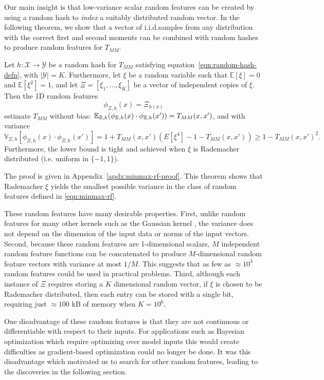Our main insight is that low-variance scalar random features can be created
by using a random hash to \emph{index} a suitably distributed random vector.
In the following theorem, we show that a vector of i.i.d.\@ samples
from any distribution with the correct first and second moments
can be combined with random hashes to produce random features for $T_{MM}$.
\begin{theorem}\label{thm:general-minmax-rf}
    Let $h:\mathcal X \to \mathcal Y$ be a random hash for $T_{MM}$ satisfying equation~\ref{eqn:random-hash-defn}, with $|\mathcal Y|=K$. Furthermore, let $\xi$ be a random variable such that $\mathbb{E}[\xi]=0$ and $\mathbb{E}[\xi^2]=1$,
    and let $\Xi=[\xi_1,\ldots,\xi_K]$ be a vector of independent copies of $\xi$.
    Then the 1D random features 
    \begin{equation}\label{eqn:minmax-rf}
        \phi_{\Xi,h}(x)=\Xi_{h(x)}  
    \end{equation}
    estimate $T_{MM}$ without bias: 
    $\mathbb{E}_{\Xi,h}(\phi_{\Xi,h}(x)\cdot\phi_{\Xi,h}(x')) = T_{MM}(x,x')$,
    and with variance
    \begin{equation}\label{eqn:general-minmax-rf-variance}
    \mathbb{V}_{\Xi,h}\left[\phi_{\Xi,h}(x)\cdot \phi_{\Xi,h}(x')\right] = 1+T_{MM}(x,x')\left(E[\xi^4]-1-T_{MM}(x,x')\right) \ge 1-T_{MM}(x,x')^2.
    \end{equation}
    Furthermore, the lower bound is tight and achieved when $\xi$ is Rademacher distributed (i.e. uniform in $\{-1,1\}$).
\end{theorem}

The proof is given in Appendix~\ref{apdx:minmax-rf-proof}. This theorem shows that Rademacher $\xi$ yields the smallest possible variance in the class of random features defined in \cref{eqn:minmax-rf}.

These random features have many desirable properties. First, unlike random features for many other kernels such as the Gaussian kernel \citep{liu2021random},
the variance does not depend on the dimension of the input data or norms of the input vectors.
Second, because these random features are 1-dimensional scalars,
$M$ independent random feature functions can be concatenated to produce $M$-dimensional random feature
vectors with variance at most $1/M$.
This suggests that as few as $\approx10^3$ random features could be used in practical problems.
Third, although each instance of $\Xi$ requires storing a $K$ dimensional random vector,
if $\xi$ is chosen to be Rademacher distributed, then each entry can be stored with a single bit,
requiring just $\approx 100$ kB of memory when $K=10^6$.

One disadvantage of these random features
is that they are not continuous or differentiable with respect to their inputs.
For applications such as Bayesian optimization which require optimizing over model inputs
this would create difficulties as gradient-based optimization could no longer be done.
It was this disadvantage which motivated us to search for other random features,
leading to the discoveries in the following section.